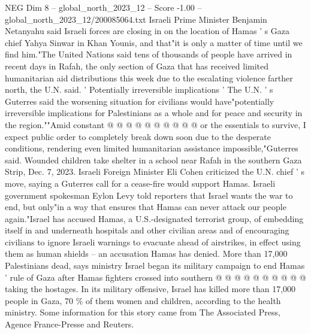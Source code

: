 \begin{textsample}{NEG Dim 8 – global\_north\_2023\_12 – Score -1.00 – global\_north\_2023\_12/200085064.txt}
Israeli Prime Minister Benjamin Netanyahu said Israeli forces are closing in on the location of Hamas ' s Gaza chief Yahya Sinwar in Khan Younis, and that"it is only a matter of time until we find him."The United Nations said tens of thousands of people have arrived in recent days in Rafah, the only section of Gaza that has received limited humanitarian aid distributions this week due to the escalating violence farther north, the U.N. said. ' Potentially irreversible implications ' The U.N. ' s Guterres said the worsening situation for civilians would have"potentially irreversible implications for Palestinians as a whole and for peace and security in the region.""Amid constant @ @ @ @ @ @ @ @ @ @ or the essentials to survive, I expect public order to completely break down soon due to the desperate conditions, rendering even limited humanitarian assistance impossible,"Guterres said.
Wounded children take shelter in a school near Rafah in the southern Gaza Strip, Dec. 7, 2023.
Israeli Foreign Minister Eli Cohen criticized the U.N. chief ' s move, saying a Guterres call for a cease-fire would support Hamas.
Israeli government spokesman Eylon Levy told reporters that Israel wants the war to end, but only"in a way that ensures that Hamas can never attack our people again."Israel has accused Hamas, a U.S.-designated terrorist group, of embedding itself in and underneath hospitals and other civilian areas and of encouraging civilians to ignore Israeli warnings to evacuate ahead of airstrikes, in effect using them as human shields -- an accusation Hamas has denied.
More than 17,000 Palestinians dead, says ministry Israel began its military campaign to end Hamas ' rule of Gaza after Hamas fighters crossed into southern @ @ @ @ @ @ @ @ @ @ taking the hostages.
In its military offensive, Israel has killed more than 17,000 people in Gaza, 70 \% of them women and children, according to the health ministry.
Some information for this story came from The Associated Press, Agence France-Presse and Reuters.

\end{textsample}
